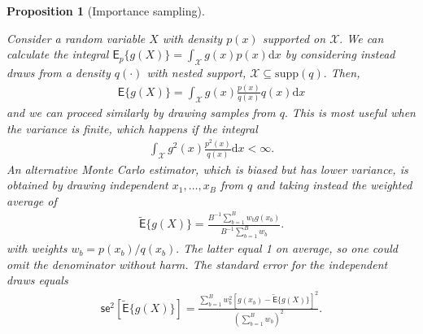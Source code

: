 \documentclass[
  11pt,
  letterpaper,
]{scrbook}
\theoremstyle{definition}
\theoremstyle{plain}
\newtheorem{proposition}{Proposition}[chapter]
\theoremstyle{plain}
\theoremstyle{plain}
\theoremstyle{definition}
\theoremstyle{definition}
\theoremstyle{plain}
\newtheorem{proposition}{Proposition}[chapter]
\theoremstyle{plain}
\theoremstyle{remark}
\begin{document}
\begin{proposition}[Importance
sampling]\protect\hypertarget{prp-importance-sampling}{}\label{prp-importance-sampling}

Consider a random variable \(X\) with density \(p(x)\) supported on
\(\mathcal{X}.\) We can calculate the integral
\(\mathsf{E}_p\{g(X)\} = \int_{\mathcal{X}} g(x) p(x) \mathrm{d}x\) by
considering instead draws from a density \(q(\cdot)\) with nested
support, \(\mathcal{X} \subseteq \mathrm{supp}(q).\) Then,
\begin{align*}
\mathsf{E}\{g(X)\} = \int_{\mathcal{X}} g(x) \frac{p(x)}{q(x)} q(x) \mathrm{d} x
\end{align*} and we can proceed similarly by drawing samples from \(q.\)
This is most useful when the variance is finite, which happens if the
integral \begin{align*}
\int_{\mathcal{X}} g^2(x) \frac{p^2(x)}{q(x)} \mathrm{d} x < \infty.
\end{align*} An alternative Monte Carlo estimator, which is biased but
has lower variance, is obtained by drawing independent
\(x_1, \ldots, x_B\) from \(q\) and taking instead the weighted average
of \begin{align*}
\widetilde{\mathsf{E}}\{g(X)\} =\frac{B^{-1} \sum_{b=1}^B w_b g(x_b) }{B^{-1}\sum_{b=1}^B w_b}.
\end{align*} with weights \(w_b = p(x_b)/q(x_b).\) The latter equal 1 on
average, so one could omit the denominator without harm. The standard
error for the independent draws equals \begin{align*}
\mathsf{se}^2[\widetilde{\mathsf{E}}\{g(X)\}] = \frac{ \sum_{b=1}^B w_b^2 \left[ g(x_b) -  \widetilde{\mathsf{E}}\{g(X)\} \right]^2}{\left(\sum_{b=1}^B w_b\right)^2}.
\end{align*}

\end{proposition}
\end{document}
